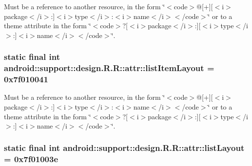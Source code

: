 Must be a reference to another resource, in the form \char`\"{}$<$code$>$@\mbox{[}+\mbox{]}\mbox{[}$<$i$>$package$<$/i$>$:\mbox{]}$<$i$>$type$<$/i$>$:$<$i$>$name$<$/i$>$$<$/code$>$\char`\"{} or to a theme attribute in the form \char`\"{}$<$code$>$?\mbox{[}$<$i$>$package$<$/i$>$:\mbox{]}\mbox{[}$<$i$>$type$<$/i$>$:\mbox{]}$<$i$>$name$<$/i$>$$<$/code$>$\char`\"{}. \hypertarget{classandroid_1_1support_1_1design_1_1_r_1_1attr_ac6c51888136f8e1fc36042faa67a482}{
\subsubsection[{listItemLayout}]{\setlength{\rightskip}{0pt plus 5cm}static final int android::support::design.R.R::attr::listItemLayout = 0x7f010041}}
\label{classandroid_1_1support_1_1design_1_1_r_1_1attr_ac6c51888136f8e1fc36042faa67a482}


Must be a reference to another resource, in the form \char`\"{}$<$code$>$@\mbox{[}+\mbox{]}\mbox{[}$<$i$>$package$<$/i$>$:\mbox{]}$<$i$>$type$<$/i$>$:$<$i$>$name$<$/i$>$$<$/code$>$\char`\"{} or to a theme attribute in the form \char`\"{}$<$code$>$?\mbox{[}$<$i$>$package$<$/i$>$:\mbox{]}\mbox{[}$<$i$>$type$<$/i$>$:\mbox{]}$<$i$>$name$<$/i$>$$<$/code$>$\char`\"{}. \hypertarget{classandroid_1_1support_1_1design_1_1_r_1_1attr_80460bb8d9297e643b4cd457851656d1}{
\subsubsection[{listLayout}]{\setlength{\rightskip}{0pt plus 5cm}static final int android::support::design.R.R::attr::listLayout = 0x7f01003e}}
\label{classandroid_1_1support_1_1design_1_1_r_1_1attr_80460bb8d9297e643b4cd457851656d1}


